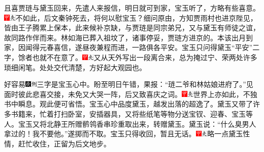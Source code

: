 {{且喜贾琏与黛玉回来，先遣人来报信，明日就可到家，宝玉听了，方略有些喜意。{\includegraphics[width=3mm]{../Images/00002}\includegraphics[width=3mm]{../Images/00012}\footnotesize \kaishu 不如此，后文秦钟死去，将何以慰宝玉？}细问原由，方知贾雨村也进京陛见，皆由王子腾累上保本，此来候补京缺，与贾琏是同宗弟兄，又与黛玉有师徒之谊，故同路作伴而来。林如海已葬入祖坟了，诸事停妥，贾琏方进京的。本该出月到家，因闻得元春喜信，遂昼夜兼程而进，一路俱各平安。宝玉只问得黛玉“平安”二字，馀者也就不在意了。{\includegraphics[width=3mm]{../Images/00002}\includegraphics[width=3mm]{../Images/00012}\footnotesize \kaishu 又从天外写出一段离合来，总为掩过宁、荣两处许多琐细闲笔。处处交代清楚，方好起大观园也。}

好容易{\includegraphics[width=3mm]{../Images/00004}\includegraphics[width=3mm]{../Images/00011}\footnotesize \kaishu 三字是宝玉心中。}盼至明日午错，果报：“琏二爷和林姑娘进府了。”见面时彼此悲喜交接，未免又大哭一阵，后又致喜庆之词。{\includegraphics[width=3mm]{../Images/00002}\includegraphics[width=3mm]{../Images/00012}\footnotesize \kaishu 世界上亦如此，不独书中瞬息。观此便可省悟。}宝玉心中品度黛玉，越发出落的超逸了。黛玉又带了许多书籍来，忙着打扫卧室，安插器具，又将些纸笔等物分送宝钗、迎春、宝玉等人。宝玉又将北静王所赠鹡鸰香串珍重取出来，转赠黛玉。黛玉说：“什么臭男人拿过的！我不要他。”遂掷而不取。宝玉只得收回，暂且无话。{\includegraphics[width=3mm]{../Images/00002}\includegraphics[width=3mm]{../Images/00012}\footnotesize \kaishu 略一点黛玉性情，赶忙收住，正留为后文地步。}

}}

